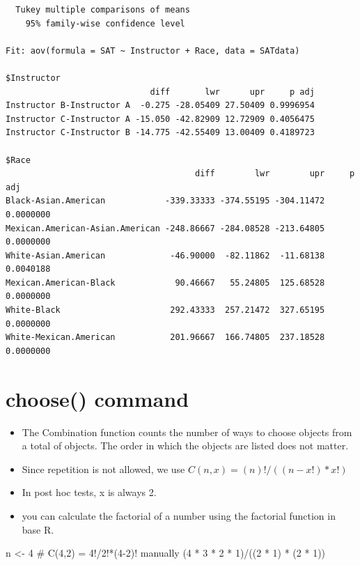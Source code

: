\documentclass[
  letterpaper,
  DIV=11,
  numbers=noendperiod]{scrreprt}
\newenvironment{Shaded}{\begin{snugshade}}{\end{snugshade}}
\newcommand{\CommentTok}[1]{\textcolor[rgb]{0.37,0.37,0.37}{#1}}
\newcommand{\DecValTok}[1]{\textcolor[rgb]{0.68,0.00,0.00}{#1}}
\newcommand{\NormalTok}[1]{\textcolor[rgb]{0.00,0.23,0.31}{#1}}
\newcommand{\OtherTok}[1]{\textcolor[rgb]{0.00,0.23,0.31}{#1}}
\newcommand{\SpecialCharTok}[1]{\textcolor[rgb]{0.37,0.37,0.37}{#1}}
\providecommand{\tightlist}{%
  \setlength{\itemsep}{0pt}\setlength{\parskip}{0pt}}\usepackage{longtable,booktabs,array}
\begin{document}
\begin{verbatim}
  Tukey multiple comparisons of means
    95% family-wise confidence level

Fit: aov(formula = SAT ~ Instructor + Race, data = SATdata)

$Instructor
                             diff       lwr      upr     p adj
Instructor B-Instructor A  -0.275 -28.05409 27.50409 0.9996954
Instructor C-Instructor A -15.050 -42.82909 12.72909 0.4056475
Instructor C-Instructor B -14.775 -42.55409 13.00409 0.4189723

$Race
                                      diff        lwr        upr     p adj
Black-Asian.American            -339.33333 -374.55195 -304.11472 0.0000000
Mexican.American-Asian.American -248.86667 -284.08528 -213.64805 0.0000000
White-Asian.American             -46.90000  -82.11862  -11.68138 0.0040188
Mexican.American-Black            90.46667   55.24805  125.68528 0.0000000
White-Black                      292.43333  257.21472  327.65195 0.0000000
White-Mexican.American           201.96667  166.74805  237.18528 0.0000000
\end{verbatim}


\chapter{choose() command}\label{choose-command}

\begin{itemize}
\tightlist
\item
  The Combination function counts the number of ways to choose objects
  from a total of objects. The order in which the objects are listed
  does not matter.
\item
  Since repetition is not allowed, we use \(C(n,x) = (n)!/((n-x!)*x!)\)
\item
  In post hoc tests, x is always 2.
\item
  you can calculate the factorial of a number using the factorial
  function in base R.
\end{itemize}

\begin{Shaded}
\begin{Highlighting}[]
\NormalTok{n }\OtherTok{\textless{}{-}} \DecValTok{4}
\CommentTok{\# C(4,2) = 4!/2!*(4{-}2)! manually}
\NormalTok{(}\DecValTok{4} \SpecialCharTok{*} \DecValTok{3} \SpecialCharTok{*} \DecValTok{2} \SpecialCharTok{*} \DecValTok{1}\NormalTok{)}\SpecialCharTok{/}\NormalTok{((}\DecValTok{2} \SpecialCharTok{*} \DecValTok{1}\NormalTok{) }\SpecialCharTok{*}\NormalTok{ (}\DecValTok{2} \SpecialCharTok{*} \DecValTok{1}\NormalTok{))}
\end{Highlighting}
\end{Shaded}
\end{document}

